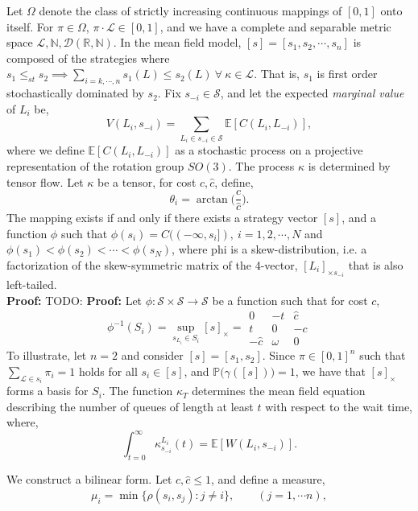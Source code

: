 \documentclass[10pt]{article}
\newcommand{\mcL}{\mathcal{L}}
\newcommand{\mcS}{\mathcal{S}}
\newcommand{\mcD}{\mathcal{D}}
\theoremstyle{definition}
\begin{document}
Let $\Omega$ denote the class of strictly increasing continuous mappings of
$[0,1]$ onto itself. For $\pi \in \Omega$, $\pi \cdot \mcL \in [0,1]$, and we have a complete 
and separable metric space $\mcL, \mathbb{N}, \mcD(\mathbb{R},\mathbb{N})$.
In the mean field model, $[s]= [s_1, s_2, \cdots, s_n]$ is composed of
the strategies where $s_1 \le_{st} s_2 \implies \sum_{i = k, \cdots, n} s_1(L)
\le s_2(L) \ \forall \ \kappa \in \mcL$. That is, $s_1$ is first order
stochastically dominated by $s_2$. 
Fix $s_{-i}\in \mcS$, and let the expected \emph{marginal value} of $L_i$ be,
$$
    V(L_i,s_{-i}) = \displaystyle\sum_{L_i\in s_{-i}\in \mcS}\mathbb{E}[C(L_i,
    L_{-i})],
$$
where we define $\mathbb{E}[C(L_i,L_{-i})]$ 
as a stochastic process on a projective representation of the rotation group
$SO(3)$. The process $\kappa$ is determined by tensor flow.
Let $\kappa$ be a tensor, for cost $c, \hat c$, define,
$$
    \theta_i = \arctan\bigg(\frac{c}{\hat c}\bigg).
$$
The mapping exists if and only if there exists a strategy vector $[s]$, and a
function $\phi$ such that $\phi(s_i) = C((-\infty,s_i]), \ i = 1,2,\cdots, N$ and $\phi(s_1) < \phi(s_2) < \cdots < \phi(s_N)$, where phi is a skew-distribution, i.e. a
factorization of the skew-symmetric
matrix of the 4-vector, $[L_i]_{\times s_{-i}}$ that is also left-tailed.\\
\textbf{Proof:} TODO: %
\textbf{Proof:} 
Let $\phi:\mcS\times\mcS \rightarrow \mcS$ be a function such that 
for cost $c$, 
$$
    \phi^{-1}(S_i) = \sup_{s_{L_i} \in S_i} [s]_\times = \begin{matrix} 0 & -t
    & \hat c \\ t & 0 & -c\\-\hat c & \omega & 0\end{matrix}
$$
To illustrate, let $n=2$ and consider $[s]= [s_1, s_2]$. Since $\pi \in [0,1]^n$
such that $\sum_{\mcL \in s_i} \pi_i = 1$ holds for all $s_i\in [s]$, and
$\mathbb{P}\big(\gamma([s])\big) = 1$, we have that $[s]_\times$ forms a basis for $S_i$. The function $\kappa_T$ determines the mean field equation
describing the number of queues of length at least $t$ with respect to the wait time, where, 
$$
    \displaystyle\int_{t=0}^\infty \kappa_{s_{-i}}^{L_i}(t) = \mathbb{E}[W(L_i, s_{-i})].
$$
We construct a bilinear form.
Let $c, \hat c \le 1$, and define a measure,
$$
    \mu_i = \min\lbrace \rho(s_i, s_j) : j\ne i\rbrace, \qquad (j = 1, \cdots
    n),
$$
\end{document}
